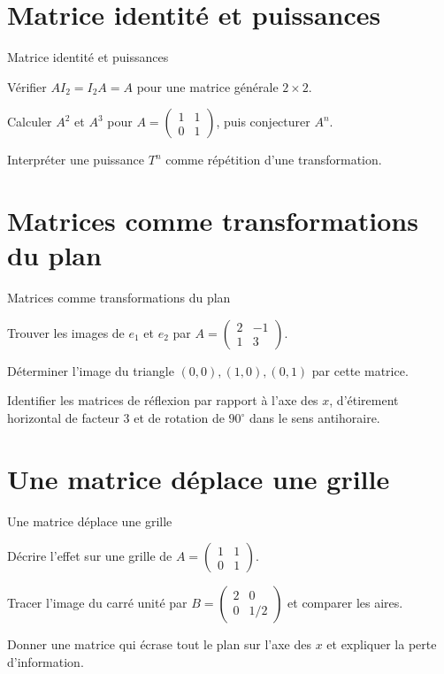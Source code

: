 \section{Matrice identité et puissances}
\label{workbook:section:11.04}
\begin{exerciseblock}{Matrice identité et puissances}
\item Vérifier $AI_2=I_2A=A$ pour une matrice générale $2\times2$.
\item Calculer $A^2$ et $A^3$ pour $A=\begin{pmatrix}1&1\\0&1\end{pmatrix}$, puis conjecturer $A^n$.
\item Interpréter une puissance $T^n$ comme répétition d'une transformation.
\end{exerciseblock}
\section{Matrices comme transformations du plan}
\label{workbook:section:11.05}
\begin{exerciseblock}{Matrices comme transformations du plan}
\item Trouver les images de $e_1$ et $e_2$ par $A=\begin{pmatrix}2&-1\\1&3\end{pmatrix}$.
\item Déterminer l'image du triangle $(0,0),(1,0),(0,1)$ par cette matrice.
\item Identifier les matrices de réflexion par rapport à l'axe des $x$, d'étirement horizontal de facteur $3$ et de rotation de $90^\circ$ dans le sens antihoraire.
\end{exerciseblock}
\section{Une matrice déplace une grille}
\label{workbook:section:11.06}
\begin{exerciseblock}{Une matrice déplace une grille}
\item Décrire l'effet sur une grille de $A=\begin{pmatrix}1&1\\0&1\end{pmatrix}$.
\item Tracer l'image du carré unité par $B=\begin{pmatrix}2&0\\0&1/2\end{pmatrix}$ et comparer les aires.
\item Donner une matrice qui écrase tout le plan sur l'axe des $x$ et expliquer la perte d'information.
\end{exerciseblock}
